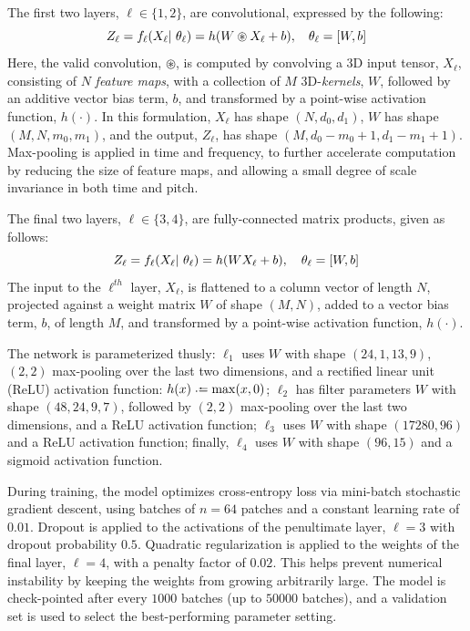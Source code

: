 \documentclass{article}
\begin{document}
The first two layers, $\ell \in \{1, 2\}$, are convolutional, expressed by the following:
\begin{equation}
\label{eq:convlayer}
\small
Z_\ell = f_\ell(X_\ell \given \theta_\ell) = h(W \circledast X_\ell + b), \quad
\theta_\ell = [W, b]
\end{equation}
Here, the valid convolution, $\circledast$, is computed by convolving a 3D input tensor,
$X_\ell$, consisting of $N$ \emph{feature maps}, with a collection of $M$ 3D-\emph{kernels}, $W$, followed by an additive vector bias term, $b$, and transformed by a point-wise activation function, $h(\cdot)$.
In this formulation, $X_\ell$ has shape $(N, d_0, d_1)$, $W$ has shape $(M, N, m_0, m_1)$,
and the output, $Z_\ell$, has shape $(M, d_0-m_0+1, d_1-m_1+1)$.
Max-pooling is applied in time and frequency, to further accelerate computation by reducing the size of feature maps, and allowing a small degree of scale invariance in both time and pitch.

The final two layers, $\ell \in \{3, 4\}$, are fully-connected matrix products, given as follows:
\begin{equation}
\label{eq:fclayer}
Z_\ell = f_\ell(X_\ell |~ \theta_\ell) = h( WX_\ell + b), \quad \theta_\ell = [W, b]
\end{equation}
The input to the $\ell^{th}$ layer, $X_\ell$, is flattened to a column vector of length $N$, projected against a weight matrix $W$ of shape $(M, N)$, added to a vector bias term, $b$, of length $M$, and transformed by a point-wise activation function, $h(\cdot)$.

The network is parameterized thusly:
$\ell_1$ uses $W$ with shape $(24, 1, 13, 9)$, $(2, 2)$ max-pooling over the last two
dimensions, and a rectified linear unit (ReLU) activation function: $h(x) \defeq \max(x, 0)$;
$\ell_2$ has filter parameters $W$ with shape $(48, 24, 9, 7)$, followed by $(2, 2)$ max-pooling over the last two dimensions, and a ReLU activation function;
$\ell_3$ uses $W$ with shape $(17280, 96)$ and a ReLU activation function;
finally, $\ell_4$ uses $W$ with shape $(96, 15)$ and a sigmoid activation function.

During training, the model optimizes cross-entropy loss via mini-batch stochastic
gradient descent, using batches of $n=64$ patches and a constant learning rate of $0.01$.
Dropout is applied to the activations of the penultimate layer, $\ell=3$ with dropout
probability $0.5$.
Quadratic regularization is applied to the weights of the final layer, $\ell=4$, with a
penalty factor of $0.02$. This helps prevent numerical instability by keeping
the weights from growing arbitrarily large.
The model is check-pointed after every $1000$ batches (up to $50000$ batches), and a 
validation set is used to select the best-performing parameter setting.
\end{document}
